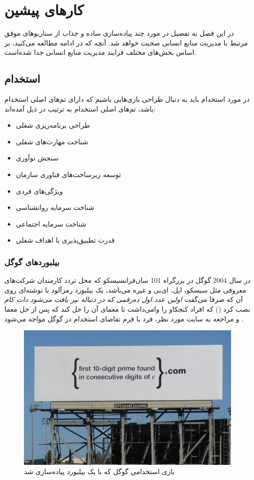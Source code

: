 \chapter{کارهای پیشین}
در این فصل به تفصیل در مورد چند پیاده‌سازی ساده و جذاب از سناریوهای موفق مرتبط با مدیریت منابع انسانی صحبت خواهد شد. آنچه که در ادامه مطالعه می‌کنید، بر اساس بخش‌های مختلف فرایند مدیریت منابع انسانی جدا شده‌است.
\section{استخدام}
در مورد استخدام باید به دنبال طراحی بازی‌هایی باشیم که دارای تم‌های اصلی استخدام باشد، تم‌های اصلی استخدام به ترتیب در ذیل آمده‌اند:
\begin{itemize}
	\item طراحی برنامه‌ریزی شغلی
	\item شناخت مهارت‌های شغلی
	\item سنجش نوآوری
	\item توسعه زیرساخت‌های فناوری سازمان
	\item ویژگی‌های فردی
	\item شناخت سرمایه روانشناسی
	\item شناخت سرمایه اجتماعی
	\item قدرت تطبیق‌پذیری با اهداف شغلی
\end{itemize}
\subsection{بیلبوردهای گوگل}
در سال 2004 گوگل در بزرگراه 101 سان‌فرانسیسکو که محل تردد کارمندان شرکت‌های معروفی مثل سیسکو، اپل، ای‌بی و غیره می‌باشد، یک بیلبورد رمزآلود با نوشته‌ای روی آن که صرفا می‌گفت \textit{اولین عدد اول ده‌رقمی که در دنباله نپر یافت می‌شود دات کام} نصب کرد () که افراد کنجکاو را وامی‌داشت تا معمای آن را حل کند که پس از حل معما و مراجعه به سایت مورد نظر، فرد با فرم تقاضای استخدام در گوگل مواجه می‌شود \cite{eprimesolve}.

\begin{figure}[!htb]
	\centering
	\includegraphics[width=\textwidth]{Figures/eprime.jpg}
	\caption{بازی استخدامی گوگل که با یک بیلبورد پیاده‌سازی شد\cite{eprimepic}}
	\label{fig:google}
\end{figure}


